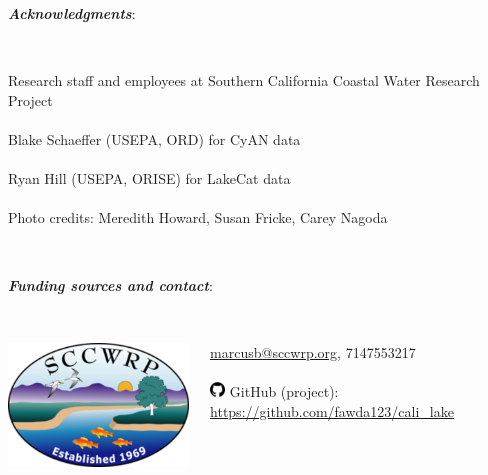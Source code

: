 \documentclass[serif]{beamer}\usepackage[]{graphicx}\usepackage[]{color}
\newcommand{\emtxt}[1]{\textbf{\textit{{\color{mypal4} #1}}}}
\begin{document}
\begin{frame}
\emtxt{Acknowledgments}:\\~\\
\begin{columns}
\begin{column}{0.8\textwidth}
{\footnotesize
Research staff and employees at Southern California Coastal Water Research Project\\~\\
Blake Schaeffer (USEPA, ORD) for CyAN data\\~\\
Ryan Hill (USEPA, ORISE) for LakeCat data\\~\\
Photo credits: Meredith Howard, Susan Fricke, Carey Nagoda \\~\\}
\end{column}
\begin{column}{0.2\textwidth}
\end{column}
\end{columns}
\vfill
\emtxt{Funding sources and contact}:\\~\\
\begin{columns}
\begin{column}{0.5\textwidth}
\vfill
\centerline{\includegraphics[width=0.6\linewidth]{fig/sccwrp_logo.png}}
\vfill
\end{column}
\begin{column}{0.5\textwidth}
\scriptsize
\href{mailto:marcusb@sccwrp.org}{marcusb@sccwrp.org}, 7147553217\\~\\
\includegraphics[width = 0.05\textwidth]{fig/git.png} GitHub (project): \href{https://github.com/fawda123/cali_lake}{https://github.com/fawda123/cali\_lake}\\~\\

\end{column}
\end{columns}
\end{frame}
\end{document}
